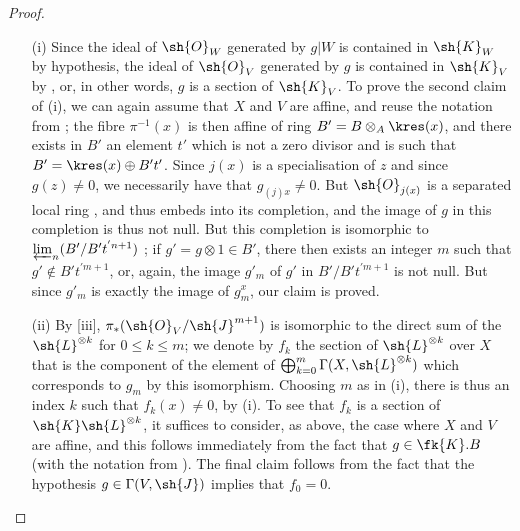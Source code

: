 \begin{proof}
\label{proof-II.8.10.5}
\begin{enumerate}
    \item[\rm{(i)}] Since the ideal of $\sh{O}_W$ generated by $g|W$ is contained in $\sh{K}_W$ by hypothesis, the ideal of $\sh{O}_V$ generated by $g$ is contained in $\sh{K}_V$ by , or, in other words, $g$ is a section of $\sh{K}_V$.
        To prove the second claim of (i), we can again assume that $X$ and $V$ are affine, and reuse the notation from ;
        the fibre $\pi^{-1}(x)$ is then affine of ring $B'=B\otimes_A\kres(x)$, and there exists in $B'$ an element $t'$ which is not a zero divisor and is such that $B'=\kres(x)\oplus B't'$.
        Since $j(x)$ is a specialisation of $z$ and since $g(z)\neq0$, we necessarily have that $g_{(j)x}\neq0$.
        But $\sh{O}_{j(x)}$ is a separated local ring , and thus embeds into its completion, and the image of $g$ in this completion is thus not null.
        But this completion is isomorphic to $\varprojlim_n(B'/B't^{'n+1})$ ;
        if $g'=g\otimes1\in B'$, there then exists an integer $m$ such that $g'\not\in B't^{'m+1}$, or, again, the image $g'_m$ of $g'$ in $B'/B't^{'m+1}$ is not null.
        But since $g'_m$ is exactly the image of $g_m^x$, our claim is proved.
    \item[\rm{(ii)}] By [iii], $\pi_*(\sh{O}_V/\sh{J}^{m+1})$ is isomorphic to the direct sum of the $\sh{L}^{\otimes k}$ for $0\leq k\leq m$;
        we denote by $f_k$ the section of $\sh{L}^{\otimes k}$ over $X$ that is the component of the element of $\bigoplus_{k=0}^m\Gamma(X,\sh{L}^{\otimes k})$ which corresponds to $g_m$ by this isomorphism.
        Choosing $m$ as in (i), there is thus an index $k$ such that $f_k(x)\neq0$, by (i).
        To see that $f_k$ is a section of $\sh{K}\sh{L}^{\otimes k}$, it suffices to consider, as above, the case where $X$ and $V$ are affine, and this follows immediately from the fact that $g\in\fk{K}.B$ (with the notation from ).
        The final claim follows from the fact that the hypothesis $g\in\Gamma(V,\sh{J})$ implies that $f_0=0$.
\end{enumerate}
\end{proof}

